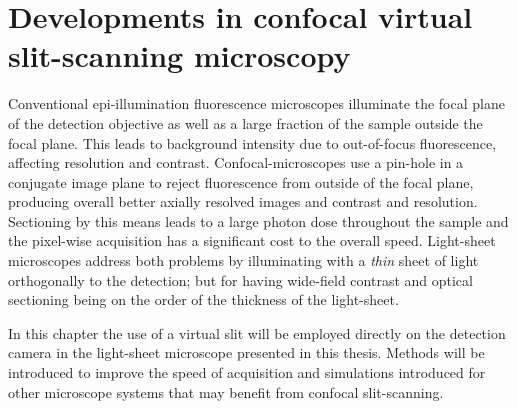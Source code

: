 \ifpdf{}
    \graphicspath{{Chapters/dualslit/Figs/Raster/}{Chapters/dualslit/Figs/PDF/}{Chapters/dualslit/Figs/}}
\else
    \graphicspath{{Chapters/dualslit/Figs/Vector/}{Chapters/dualslit/Figs/}}
\fi

\chapter{Developments in confocal virtual \gls{slit-scanning} microscopy}\label{chapter:dualslit}



Conventional epi-illumination fluorescence microscopes illuminate the focal plane of the detection objective as well as a large fraction of the sample outside the focal plane.
This leads to background intensity due to out-of-focus fluorescence, affecting resolution and contrast.
Confocal-microscopes use a pin-hole in a conjugate image plane to %
reject fluorescence from outside of the focal plane, producing overall better axially resolved images and contrast and resolution.
Sectioning by this means leads to a large photon dose throughout the sample and the pixel-wise acquisition has a significant cost to the overall speed.
Light-sheet microscopes address both problems by illuminating with a \emph{thin} sheet of light orthogonally to the detection; but for having wide-field contrast and optical sectioning being on the order of the thickness of the light-sheet.

In this chapter the use of a virtual slit will be employed directly on the detection camera in the \gls{light-sheet} microscope presented in this thesis.
Methods will be introduced to improve the speed of acquisition and simulations introduced for other microscope systems that may benefit from confocal \gls{slit-scanning}.

